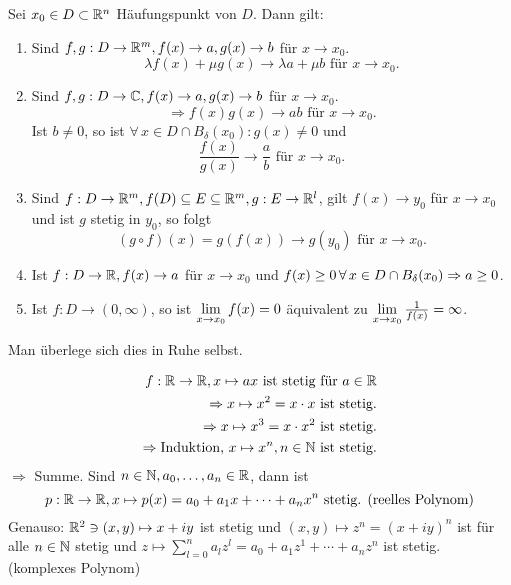 \documentclass[../ana1.tex]{subfiles}
\begin{document}
\begin{satz}
    Sei \( x_0 \in D \subset \mathbb{R}^n \) Häufungspunkt von \( D \). 
    Dann gilt:
    \begin{enumerate}
        \item Sind \( f, g: D \rightarrow \mathbb{R}^m, f(x) \rightarrow a, 
        g(x) \rightarrow b \) für \( x \rightarrow x_0 \).
        \[ \lambda f(x) + \mu g(x) \rightarrow \lambda a + \mu b
        \text{ für } x \rightarrow x_0. \]
        \item Sind \( f, g: D \rightarrow \mathbb{C}, f(x) \rightarrow a,
        g(x) \rightarrow b \) für \( x\rightarrow x_0 \).\\
        \[ \Rightarrow f(x) g(x) \rightarrow a b \text{ für } 
        x\rightarrow x_0. \]
        Ist \( b\neq 0 \), so ist \( \forall \, x\in 
        D \cap B_\delta(x_0) : g(x) \neq 0 \) und 
        \[ \frac{f(x)}{g(x)} \rightarrow \frac{a}{b} \text{ für } 
        x\rightarrow x_0. \]
        \item Sind \( f: D \rightarrow \mathbb{R}^m, f(D) \subseteq E 
        \subseteq \mathbb{R}^m, g : E \rightarrow \mathbb{R}^l \), gilt 
        \( f(x) \rightarrow y_0 \) für \( x\rightarrow x_0 \) und
        ist \(g\) stetig in \( y_0 \), so folgt
        \[ (g\circ f)(x) = g(f(x)) \rightarrow g(y_0) \text{ für }
        x \rightarrow x_0. \]
        \item Ist \( f: D\rightarrow \mathbb{R}, f(x) \rightarrow a \) für 
        \( x \rightarrow x_0 \) und \( f(x) \geq 0 \,\forall \, 
        x \in D \cap B_\delta(x_0) \\ 
        \Rightarrow a \geq 0 \).
        \item Ist \( f : D \rightarrow (0, \infty) \), so ist 
        \( \lim\limits_{x\rightarrow x_0} f(x) = 0 \) äquivalent zu 
        \( \lim\limits_{x\rightarrow x_0} \frac{1}{f(x)} = \infty \).
    \end{enumerate}
\end{satz}
\begin{bew}
    Man überlege sich dies in Ruhe selbst.
\end{bew}
\begin{bspe}
    \begin{align*}
        f : \mathbb{R} \rightarrow \mathbb{R}, x \mapsto ax \text{ ist stetig für } a \in \mathbb{R} \\
        \Rightarrow x \mapsto x^2 = x \cdot x \text{ ist stetig.}\\
        \Rightarrow x \mapsto x^3 = x \cdot x^2 \text{ ist stetig.}\\
        \Rightarrow \text{Induktion, } x \mapsto x^n, n\in \mathbb{N} \text{ ist stetig.}\\
    \end{align*}
    \( \Rightarrow \) Summe. Sind \( n\in\mathbb{N}, a_0, \ldots,a_n \in \mathbb{R} \),
    dann ist 
    \[ p : \mathbb{R} \rightarrow \mathbb{R}, x\mapsto p(x) 
    = a_0 + a_1 x + \cdots + a_n x^n 
    \text{ stetig. (reelles Polynom)} \]
    Genauso: \( \mathbb{R}^2 \ni (x,y) \mapsto x + iy \) ist stetig und 
    \( (x,y) \mapsto z^n = {(x + iy)}^n \) ist für alle \( n\in\mathbb{N} \)
    stetig und \( z \mapsto \sum_{l=0}^n a_l z^l = a_0 + a_1 z^1 
    + \cdots + a_n z^n \) ist stetig. (komplexes Polynom)
\end{bspe}
\end{document}
